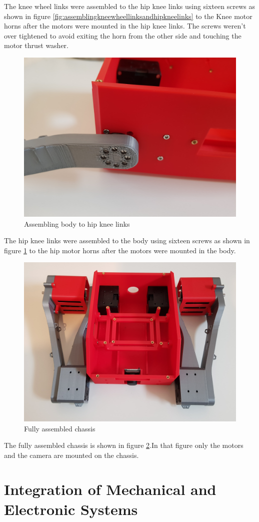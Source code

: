 The knee wheel links were assembled to the hip knee links using sixteen screws as shown in figure \ref{fig:assemblingkneewheellinksandhipkneelinks} to the Knee motor horns after the motors were mounted in the hip knee links.
The screws weren't over tightened to avoid exiting the horn from the other side and touching the motor thrust washer.
\begin{figure}[h]
	\centering
	\includegraphics[width=0.5\linewidth]{assembling_body_hip_knee_links}
	\caption{Assembling body to hip knee links}
	\label{fig:assemblingbodyhipkneelinks}
\end{figure}

The hip knee links were assembled to the body using sixteen screws as shown in figure \ref{fig:assemblingbodyhipkneelinks} to the hip motor horns after the motors were mounted in the body.

\begin{figure}[h]
	\centering
	\includegraphics[width=0.5\linewidth]{fully_assembled_chassis}
	\caption{Fully assembled chassis}
	\label{fig:fullyassembledchassis}
\end{figure}
The fully assembled chassis is shown in figure \ref{fig:fullyassembledchassis}.In that figure only the motors and the camera are mounted on the chassis.

\section{Integration of Mechanical and Electronic Systems}
